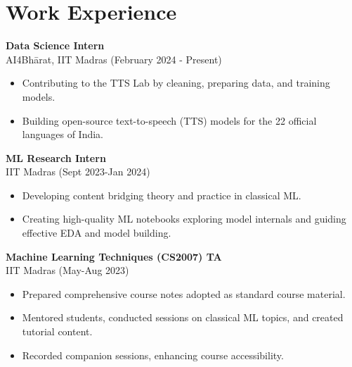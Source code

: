 \documentclass[a4paper,10pt]{article}
\begin{document}
\section*{Work Experience}
\textbf{Data Science Intern} \\
AI4Bhārat, IIT Madras (February 2024 - Present)
\begin{itemize}[noitemsep]
    \item Contributing to the TTS Lab by cleaning, preparing data, and training models.
    \item Building open-source text-to-speech (TTS) models for the 22 official languages of India.
\end{itemize}
\textbf{ML Research Intern} \\
IIT Madras (Sept 2023-Jan 2024)
\begin{itemize}[noitemsep]
    \item Developing content bridging theory and practice in classical ML.
    \item Creating high-quality ML notebooks exploring model internals and guiding effective EDA and model building.
\end{itemize}
\textbf{Machine Learning Techniques (CS2007) TA} \\
IIT Madras (May-Aug 2023)
\begin{itemize}[noitemsep]
    \item Prepared comprehensive course notes adopted as standard course material.
    \item Mentored students, conducted sessions on classical ML topics, and created tutorial content.
    \item Recorded companion sessions, enhancing course accessibility.
\end{itemize}

\newpage
\end{document}
